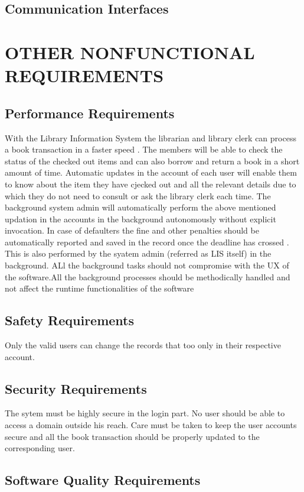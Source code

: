 \documentclass{article}
\begin{document}
\subsection{Communication Interfaces}

\section{OTHER NONFUNCTIONAL REQUIREMENTS}
\subsection{Performance Requirements}
With the Library Information System the librarian and library clerk can process a book transaction in a faster speed .
The members will be able to check the status of the checked out items and can also borrow and return a book in a short amount of time.
Automatic updates in the account of each user will enable them to know about the item they have cjecked out and all the relevant details due to which they do not need to consult or ask the library clerk each time.
The background system admin will automatically perform the above mentioned updation in the accounts in the background autonomously without explicit invocation.
In case of defaulters the fine and other penalties should be automatically reported and saved in the record once the deadline has crossed . This is also performed by the syatem admin (referred as LIS itself) in the background.
ALl the background tasks should not compromise with the UX of the software.All the background processes should be methodically handled and not affect the runtime functionalities of the software

\subsection{Safety Requirements}
Only the valid users can change the records that too only in their respective account.
\subsection{Security Requirements}
The sytem must be highly secure in the login part.
No user should be able to access a domain outside his reach.
Care must be taken to keep the user accounts secure and all the book transaction should be properly updated to the corresponding user.

\subsection{Software Quality Requirements}
\end{document}
